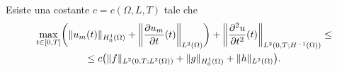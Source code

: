 \begin{teorema} \label{t:stima-energia-iperboliche}
    Esiste una costante $c=c(\Omega,L,T)$ tale che
    \begin{multline}
        \max_{t\in[0,T]}\biggl(\norm{u_m(t)}_{\sobHc[1]{\Omega}}+\norm[\bigg]{\drp{u_m}{t}(t)}_{\leb[2]{\Omega}}\biggr)+\norm[\bigg]{\ddrp{u}{t}(t)}_{\leb[2]{0,T;\sobH[-1]{\Omega}}}\le\\ \le
        c\bigl(\norm{f}_{\leb[2]{0,T;\leb[2]{\Omega}}}+\norm{g}_{\sobHc[1]{\Omega}}+\norm{h}_{\leb[2]{\Omega}}\bigr).
        \label{eq:stima-energia-iperboliche}
    \end{multline}
\end{teorema}
